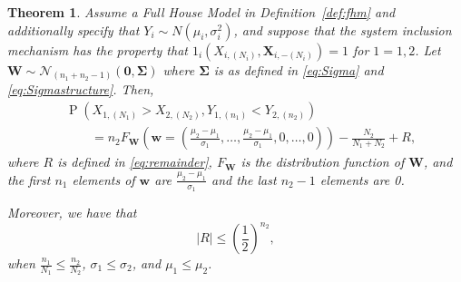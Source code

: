 \documentclass[12pt]{article}
\DeclareMathOperator*{\Prob}{P}
\newtheorem{theorem}{Theorem}[section]
\begin{document}
\begin{theorem} 
\label{theorem:normalgeneral}
Assume a Full House Model in Definition~\ref{def:fhm} and additionally specify that $Y_i \sim N(\mu_i,\sigma_i^2)$, and suppose that the system inclusion mechanism has the property that $1_i(X_{i,(N_i)}, \textbf{X}_{i,-(N_i)}) = 1$ for $1 = 1,2$. Let $\mathbf{W} \sim \mathcal{N}_{(n_1 + n_2 - 1)}(\boldsymbol{0}, \boldsymbol{\Sigma})$ where $\boldsymbol{\Sigma}$ is as defined in \eqref{eq:Sigma} and \eqref{eq:Sigmastructure}. Then,  
\begin{equation} \label{eq:paradoxnormal}
\begin{split}
  &\Prob\left(X_{1,(N_1)} > X_{2,(N_2)}, Y_{1,(n_1)} < Y_{2,(n_2)}\right) \\
	&\qquad= n_2F_{\mathbf{W}}(\mathbf{w} = (\frac{\mu_2 - \mu_1}{\sigma_1}, \dots, \frac{\mu_2 - \mu_1}{\sigma_1}, 0, \dots, 0)) - \frac{N_2}{N_1 + N_2} + R,	
\end{split}
\end{equation}
where $R$ is defined in \eqref{eq:remainder}, $F_{\mathbf{W}}$ is the distribution function of $\mathbf{W}$, and the first $n_1$ elements of $\mathbf{w}$ are $\frac{\mu_2 - \mu_1}{\sigma_1}$ and the last $n_2-1$ elements are 0. 

Moreover, we have that
\begin{equation} \label{eq:remainder-bound}
  |R| \leq \left(\frac{1}{2}\right)^{n_2},
\end{equation}
when $\frac{n_1}{N_1} \leq \frac{n_2}{N_2}$, $\sigma_1 \leq \sigma_2$, and $\mu_1 \leq \mu_2$.
\end{theorem}
\end{document}
